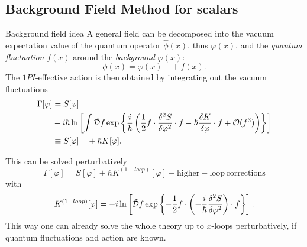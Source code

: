 \subsection{Background Field Method for scalars}
\begin{mybox}{Background field idea}
A general field can be decomposed into the vacuum expectation value of the quantum operator $\hat{\phi}(x)$, thus $\varphi(x)$, and the \emph{quantum fluctuation} $f(x)$ around the \emph{background} $\varphi(x)$:
\begin{equation}
	\phi(x) = \varphi(x) \quad + f(x).
\end{equation}
The $1PI$-effective action is then obtained by integrating out the vacuum fluctuations
\begin{align}
	\Gamma[\varphi] &= S[\varphi] \nonumber \\
	&-i  \hbar \ln\left[\int \tilde{\mathcal{D}}f \exp\left\{ \frac{i}{\hbar } \left(\frac{1}{2} f \cdot \frac{\delta^2 S}{\delta \varphi^2} \cdot f-\hbar \frac{\delta K}{\delta \varphi} \cdot f + \mathcal{O}(f^3) \right)    \right\}\right] \\
	&\equiv S[\varphi] \quad + \hbar K[\varphi].
\end{align}
\end{mybox}
This can be solved perturbatively
\begin{equation}
	\Gamma[\varphi] = S[\varphi] + \hbar K^{(1-loop)} [\varphi] + \mathrm{higher-loop \, corrections}
\end{equation}
with 
\begin{equation}
	K^{(1-loop)} [\varphi] = -i \ln\left[\tilde{\mathcal{D}}f \exp \left\{- \frac{1}{2} f\cdot \left(- \frac{i}{\hbar} \frac{\delta^2 S}{\delta \varphi^2}\right)\cdot f \right\}\right].
\end{equation}
This way one can already solve the whole theory up to $x$-loops perturbatively, if quantum fluctuations and action are known.
